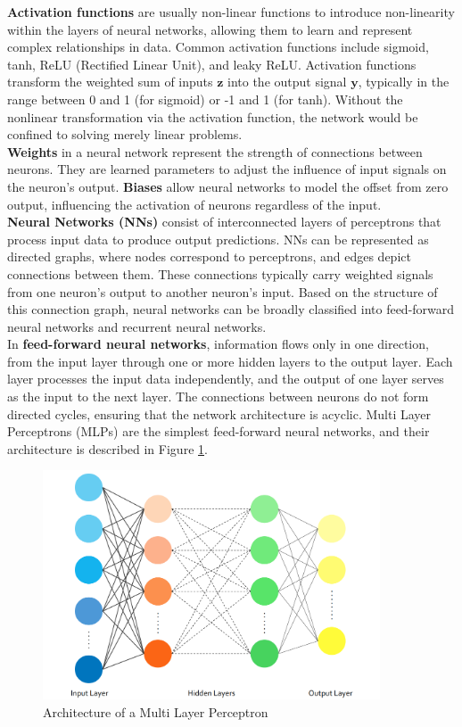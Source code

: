\textbf{Activation functions} are usually non-linear functions to introduce non-linearity within the layers of neural networks, allowing them to learn and represent complex relationships in data. Common activation functions include sigmoid, tanh, ReLU (Rectified Linear Unit), and leaky ReLU. Activation functions transform the weighted sum of inputs $\mathbf{z}$ into the output signal $\mathbf{y}$, typically in the range between 0 and 1 (for sigmoid) or -1 and 1 (for tanh). Without the nonlinear transformation via the activation function, the network would be confined to solving merely linear problems. \\
\textbf{Weights} in a neural network represent the strength of connections between neurons. They are learned parameters to adjust the influence of input signals on the neuron's output. \textbf{Biases} allow neural networks to model the offset from zero output, influencing the activation of neurons regardless of the input.\\
\textbf{Neural Networks (NNs)} consist of interconnected layers of perceptrons that process input data to produce output predictions. NNs can be represented as directed graphs, where nodes correspond to perceptrons, and edges depict connections between them. These connections typically carry weighted signals from one neuron's output to another neuron's input. Based on the structure of this connection graph, neural networks can be broadly classified into feed-forward neural networks and recurrent neural networks.\\
In \textbf{feed-forward neural networks}, information flows only in one direction, from the input layer through one or more hidden layers to the output layer. Each layer processes the input data independently, and the output of one layer serves as the input to the next layer. The connections between neurons do not form directed cycles, ensuring that the network architecture is acyclic. Multi Layer Perceptrons (MLPs) are the simplest feed-forward neural networks, and their architecture is described in Figure \ref{fig:MLP}. 
\begin{figure}[ht]
    \centering
    \includegraphics[width=10cm]{images/Theory-DL/MLP.png}
    \caption{Architecture of a Multi Layer Perceptron}
    \label{fig:MLP}
  \end{figure}
